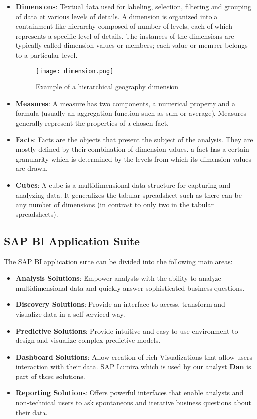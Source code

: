 \begin{itemize}
	\item \textbf{Dimensions}: Textual data used for labeling, selection, filtering and grouping of data at various levels of details. A dimension is organized into a containment-like hierarchy composed of number of levels, each of which represents a specific level of details. The instances of the dimensions are typically called dimension values or members; each value or member belongs to a particular level.

\begin{figure}[htbp]
\centering
	\texttt{[image: dimension.png]}
	\caption{Example of a hierarchical geography dimension}
	\label{fig:dimension}
\end{figure}

	\item \textbf{Measures}: A measure has two components, a numerical property and a formula (usually an aggregation function such as sum or average). Measures generally represent the properties of a chosen fact.
	\item \textbf{Facts}: Facts are the objects that present the subject of the analysis. They are mostly defined by their combination of dimension values. a fact has a certain granularity which is determined by the levels from which its dimension values are drawn.
	\item \textbf{Cubes}: A cube is a multidimensional data structure for capturing and analyzing data. It generalizes the tabular spreadsheet such as there can be any number of dimensions (in contrast to only two in the tabular spreadsheets).
\end{itemize}

\subsection{SAP BI Application Suite}

The SAP BI application suite can be divided into the following main areas:

\begin{itemize}
	\item \textbf{Analysis Solutions}: Empower analysts with the ability to analyze multidimensional data and quickly answer sophisticated business questions.
	\item \textbf{Discovery Solutions}: Provide an interface to access, transform and visualize data in a self-serviced way.
	\item \textbf{Predictive Solutions}: Provide intuitive and easy-to-use environment to design and visualize complex predictive models.
	\item \textbf{Dashboard Solutions}: Allow creation of rich Visualizations that allow users interaction with their data. SAP Lumira which is used by our analyst \textbf{Dan} is part of these solutions.
	\item \textbf{Reporting Solutions}: Offers powerful interfaces that enable analysts and non-technical users to ask spontaneous and iterative business questions about their data.
\end{itemize}

